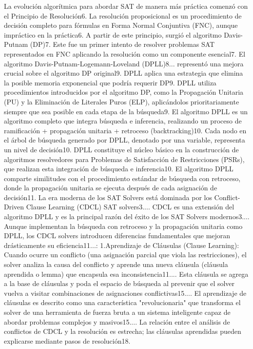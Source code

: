 La evolución algorítmica para abordar SAT de manera más práctica comenzó con el Principio de Resolución6. La resolución proposicional es un procedimiento de decisión completo para fórmulas en Forma Normal Conjuntiva (FNC), aunque impráctico en la práctica6.
A partir de este principio, surgió el algoritmo Davis-Putnam (DP)7. Este fue un primer intento de resolver problemas SAT representados en FNC aplicando la resolución como un componente esencial7.
El algoritmo Davis-Putnam-Logemann-Loveland (DPLL)8... representó una mejora crucial sobre el algoritmo DP original9. DPLL aplica una estrategia que elimina la posible memoria exponencial que podría requerir DP9. DPLL utiliza procedimientos introducidos por el algoritmo DP, como la Propagación Unitaria (PU) y la Eliminación de Literales Puros (ELP), aplicándolos prioritariamente siempre que sea posible en cada etapa de la búsqueda9. El algoritmo DPLL es un algoritmo completo que integra búsqueda e inferencia, realizando un proceso de ramificación + propagación unitaria + retroceso (backtracking)10. Cada nodo en el árbol de búsqueda generado por DPLL, denotado por una variable, representa un nivel de decisión10. DPLL constituye el núcleo básico en la construcción de algoritmos resolvedores para Problemas de Satisfacción de Restricciones (PSRs), que realizan esta integración de búsqueda e inferencia10. El algoritmo DPLL comparte similitudes con el procedimiento estándar de búsqueda con retroceso, donde la propagación unitaria se ejecuta después de cada asignación de decisión11.
La era moderna de los SAT Solvers está dominada por los Conflict-Driven Clause Learning (CDCL) SAT solvers3.... CDCL es una extensión del algoritmo DPLL y es la principal razón del éxito de los SAT Solvers modernos3.... Aunque implementan la búsqueda con retroceso y la propagación unitaria como DPLL, los CDCL solvers introducen diferencias fundamentales que mejoran drásticamente su eficiencia11...:
1.Aprendizaje de Cláusulas (Clause Learning): Cuando ocurre un conflicto (una asignación parcial que viola las restricciones), el solver analiza la causa del conflicto y aprende una nueva cláusula (cláusula aprendida o lemma) que encapsula esa inconsistencia11.... Esta cláusula se agrega a la base de cláusulas y poda el espacio de búsqueda al prevenir que el solver vuelva a visitar combinaciones de asignaciones conflictivas15.... El aprendizaje de cláusulas es descrito como una característica "revolucionaria" que transforma el solver de una herramienta de fuerza bruta a un sistema inteligente capaz de abordar problemas complejos y masivos15.... La relación entre el análisis de conflictos de CDCL y la resolución es estrecha; las cláusulas aprendidas pueden explicarse mediante pasos de resolución18.
